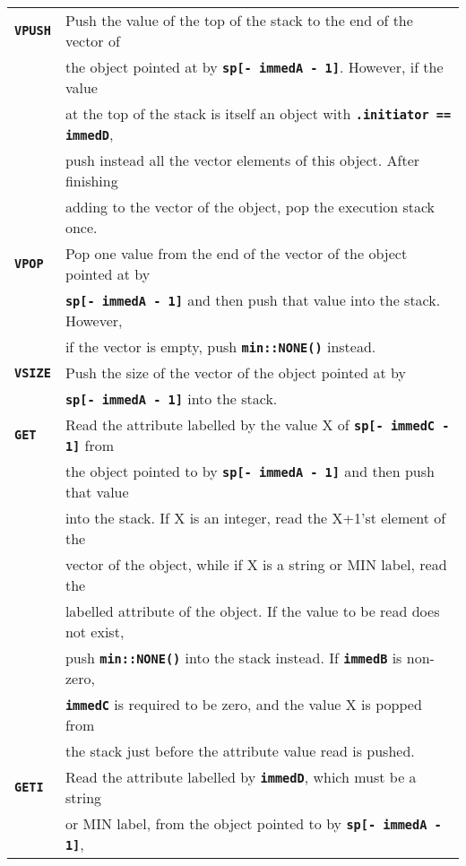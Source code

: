 \documentclass[12pt]{article}
\makeatletter
\newcommand{\TT}[1]{{\tt \bfseries #1}}
\newcommand{\ttkey}[1]{\TT{#1}\index{#1@{\tt #1}}}
\newlength{\figurewidth}
\newenvironment{boxedfigure}[1][!btp]%
	{\begin{figure*}[#1]
	 \begin{lrbox}{\figurebox}
	 \begin{minipage}{\figurewidth}

	 \vspace*{1ex}}%
	{
	 \vspace*{1ex}

	 \end{minipage}
	 \end{lrbox}

	 \centering
	 \fbox{\hspace*{0.1in}\usebox{\figurebox}\hspace*{0.1in}}
	 \end{figure*}}
\makeatother
\begin{document}
\begin{boxedfigure}

\begin{center}
\small
\begin{tabular}{|l|l|}
\hline
\ttkey{VPUSH}
    & Push the value of the top of the stack to the end of the vector of \\
    & the object pointed at by \TT{sp[- immedA - 1]}. However, if the value \\
    & at the top of the stack is itself an object with 
                    \TT{.initiator == immedD}, \\
    & push instead all the vector elements of this object.  After finishing \\
    & adding to the vector of the object, pop the execution stack once. 
\\\hline
\ttkey{VPOP}
    & Pop one value from the end of the vector of the object pointed at by \\
    & \TT{sp[- immedA - 1]} and then push that value into the stack.
        However, \\
    & if the vector is empty, push \TT{min::NONE()} instead.
\\\hline
\ttkey{VSIZE}
    & Push the size of the vector of the object pointed at by \\
    & \TT{sp[- immedA - 1]} into the stack.
\\\hline
\ttkey{GET}
    & Read the attribute labelled by the value X
        of \TT{sp[- immedC - 1]} from \\
    & the object pointed to by \TT{sp[- immedA - 1]} and then push that value \\
    & into the stack.  If X is an integer, read the X+1'st element of the \\
    & vector of the object, while if X is a string or MIN label, read the \\
    & labelled attribute of the object.  If the value to be read does not
    		exist, \\
    & push \TT{min::NONE()} into the stack instead.  If \TT{immedB}
    	is non-zero, \\
    & \TT{immedC} is required to be zero, and the value X is popped from \\
    & the stack just before the attribute value read is pushed.
\\\hline
\ttkey{GETI}
    & Read the attribute labelled by \TT{immedD}, which must be a string \\
    & or MIN label, from the object pointed to by \TT{sp[- immedA - 1]}, \\

\end{tabular}
\end{center}
\end{boxedfigure}
\end{document}
